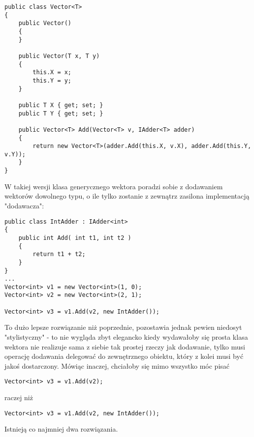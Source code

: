 \begin{scriptsize}
\begin{verbatim}
public class Vector<T>
{
    public Vector()
    {
    }

    public Vector(T x, T y)
    {
        this.X = x;
        this.Y = y;
    }

    public T X { get; set; }
    public T Y { get; set; }

    public Vector<T> Add(Vector<T> v, IAdder<T> adder)
    {
        return new Vector<T>(adder.Add(this.X, v.X), adder.Add(this.Y, v.Y));
    }
}
\end{verbatim}
\end{scriptsize}

W takiej wersji klasa generycznego wektora poradzi sobie z dodawaniem wektorów dowolnego typu, o ile tylko
zostanie z zewnątrz zasilona implementacją "dodawacza":

\begin{scriptsize}
\begin{verbatim}
public class IntAdder : IAdder<int>
{
    public int Add( int t1, int t2 )
    {
        return t1 + t2;
    }
}
...
Vector<int> v1 = new Vector<int>(1, 0);
Vector<int> v2 = new Vector<int>(2, 1);

Vector<int> v3 = v1.Add(v2, new IntAdder());
\end{verbatim}
\end{scriptsize}

To dużo lepsze rozwiązanie niż poprzednie, pozostawia jednak pewien niedosyt "stylistyczny" - to nie wygląda zbyt
elegancko kiedy wydawałoby się prosta klasa wektora nie realizuje sama z siebie tak prostej rzeczy jak dodawanie, tylko
musi operację dodawania delegować do zewnętrznego obiektu, który z kolei musi być jakoś dostarczony. Mówiąc inaczej,
chciałoby się mimo wszystko móc pisać

\begin{scriptsize}
\begin{verbatim}
Vector<int> v3 = v1.Add(v2);
\end{verbatim}
\end{scriptsize}

raczej niż

\begin{scriptsize}
\begin{verbatim}
Vector<int> v3 = v1.Add(v2, new IntAdder());
\end{verbatim}
\end{scriptsize}

Istnieją co najmniej dwa rozwiązania. 

